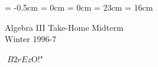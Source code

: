 

\topmargin = -0.5cm %
\oddsidemargin = 0cm \evensidemargin = 0cm
\textheight = 23cm \textwidth = 16cm 

\newcommand{\bZ}{\mbox{\boldmath $Z$}}
\newcommand{\bQ}{\mbox{\boldmath $Q$}}
\newcommand{\bR}{\mbox{\boldmath $R$}}
\newcommand{\bC}{\mbox{\boldmath $C$}}
\pagestyle{empty}


\begin{center}
{\gt\LARGE Algebra III  Take-Home Midterm}\\
{\gt Winter 1996-7}
\end{center}

\noindent
$B2rEz$O!"%

